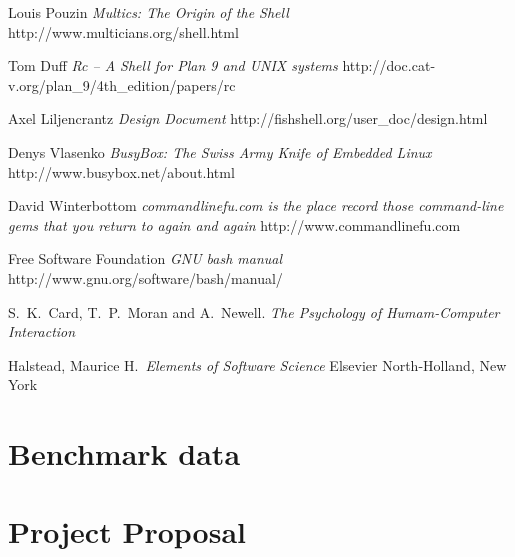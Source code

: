 \documentclass[12pt,twoside,notitlepage]{report}
\begin{document}
\begin{thebibliography}{8} %

  Louis Pouzin
  \emph{Multics: The Origin of the Shell}
  http://www.multicians.org/shell.html

  Tom Duff
  \emph{Rc -- A Shell for Plan 9 and UNIX systems}
  http://doc.cat-v.org/plan\_9/4th\_edition/papers/rc

  Axel Liljencrantz
  \emph{Design Document}
  http://fishshell.org/user\_doc/design.html

  Denys Vlasenko
  \emph{BusyBox: The Swiss Army Knife of Embedded Linux}
  http://www.busybox.net/about.html

  David Winterbottom
  \emph{commandlinefu.com is the place record those command-line gems that
  you return to again and again}
  http://www.commandlinefu.com

  Free Software Foundation
  \emph{GNU bash manual}
  http://www.gnu.org/software/bash/manual/

  S.\ K.\ Card, T.\ P.\ Moran and A.\ Newell. 
  \emph{The Psychology of Humam-Computer Interaction}

  Halstead, Maurice H.\ 
  \emph{Elements of Software Science}
  Elsevier North-Holland, New York

\end{thebibliography}
\cleardoublepage

\appendix

\chapter{Benchmark data}

\chapter{Project Proposal}

\parindent 0pt
\parskip 6pt

\end{document}
